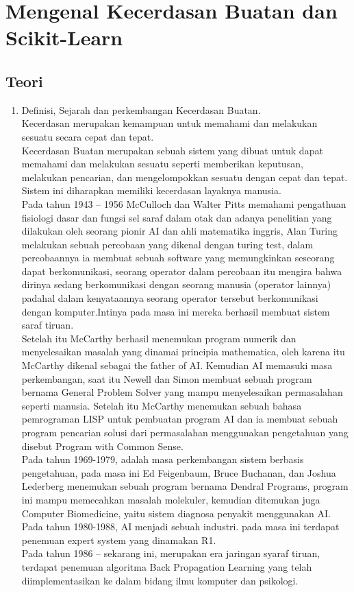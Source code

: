 \chapter{Mengenal Kecerdasan Buatan dan Scikit-Learn}

\section{Teori}
\begin{enumerate}
\item Definisi, Sejarah dan perkembangan Kecerdasan Buatan.\\
Kecerdasan merupakan kemampuan untuk memahami dan melakukan sesuatu secara cepat dan tepat.\\
Kecerdasan Buatan merupakan sebuah sistem yang dibuat untuk dapat memahami dan melakukan sesuatu seperti memberikan keputusan, melakukan pencarian, dan mengelompokkan sesuatu dengan cepat dan tepat. Sistem ini diharapkan memiliki kecerdasan layaknya manusia.\\
Pada tahun 1943 – 1956 McCulloch dan Walter Pitts memahami pengathuan fisiologi dasar dan fungsi sel saraf dalam otak dan adanya penelitian yang dilakukan oleh seorang pionir AI dan ahli matematika inggris, Alan Turing melakukan sebuah percobaan yang dikenal dengan turing test, dalam percobaannya ia membuat sebuah software yang memungkinkan seseorang dapat berkomunikasi, seorang operator dalam percobaan itu mengira bahwa dirinya sedang berkomunikasi dengan seorang manusia (operator lainnya) padahal dalam kenyataannya seorang operator tersebut berkomunikasi dengan komputer.Intinya pada masa ini mereka berhasil membuat sistem saraf tiruan.\\
Setelah itu McCarthy berhasil menemukan program numerik dan menyelesaikan masalah yang dinamai principia mathematica, oleh karena itu McCarthy dikenal sebagai the father of AI. Kemudian AI memasuki masa perkembangan, saat itu Newell dan Simon membuat sebuah program bernama General Problem Solver yang mampu menyelesaikan permasalahan seperti manusia. Setelah itu McCarthy menemukan sebuah bahasa pemrograman LISP untuk pembuatan program AI dan ia membuat sebuah program pencarian solusi dari permasalahan menggunakan pengetahuan yang disebut Program with Common Sense. \\ 
Pada tahun 1969-1979, adalah masa perkembangan sistem berbasis pengetahuan, pada masa ini Ed Feigenbaum, Bruce Buchanan, dan Joshua Lederberg menemukan sebuah program bernama Dendral Programs, program ini mampu memecahkan masalah molekuler, kemudian ditemukan juga Computer Biomedicine, yaitu sistem diagnosa penyakit menggunakan AI.\\
Pada tahun 1980-1988, AI menjadi sebuah industri. pada masa ini terdapat penemuan expert system yang dinamakan R1.\\
Pada tahun 1986 – sekarang ini, merupakan era jaringan syaraf tiruan, terdapat penemuan algoritma Back Propagation Learning yang telah diimplementasikan ke dalam bidang ilmu komputer dan psikologi.


\end{enumerate}

